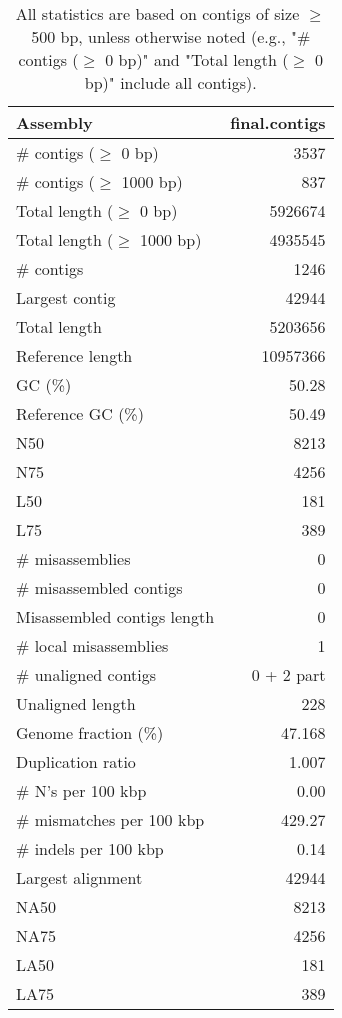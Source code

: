 \documentclass[12pt,a4paper]{article}
\begin{document}
\begin{table}[ht]
\begin{center}
\caption{All statistics are based on contigs of size $\geq$ 500 bp, unless otherwise noted (e.g., "\# contigs ($\geq$ 0 bp)" and "Total length ($\geq$ 0 bp)" include all contigs).}
\begin{tabular}{|l*{1}{|r}|}
\hline
Assembly & final.contigs \\ \hline
\# contigs ($\geq$ 0 bp) & 3537 \\ \hline
\# contigs ($\geq$ 1000 bp) & 837 \\ \hline
Total length ($\geq$ 0 bp) & 5926674 \\ \hline
Total length ($\geq$ 1000 bp) & 4935545 \\ \hline
\# contigs & 1246 \\ \hline
Largest contig & 42944 \\ \hline
Total length & 5203656 \\ \hline
Reference length & 10957366 \\ \hline
GC (\%) & 50.28 \\ \hline
Reference GC (\%) & 50.49 \\ \hline
N50 & 8213 \\ \hline
N75 & 4256 \\ \hline
L50 & 181 \\ \hline
L75 & 389 \\ \hline
\# misassemblies & 0 \\ \hline
\# misassembled contigs & 0 \\ \hline
Misassembled contigs length & 0 \\ \hline
\# local misassemblies & 1 \\ \hline
\# unaligned contigs & 0 + 2 part \\ \hline
Unaligned length & 228 \\ \hline
Genome fraction (\%) & 47.168 \\ \hline
Duplication ratio & 1.007 \\ \hline
\# N's per 100 kbp & 0.00 \\ \hline
\# mismatches per 100 kbp & 429.27 \\ \hline
\# indels per 100 kbp & 0.14 \\ \hline
Largest alignment & 42944 \\ \hline
NA50 & 8213 \\ \hline
NA75 & 4256 \\ \hline
LA50 & 181 \\ \hline
LA75 & 389 \\ \hline
\end{tabular}
\end{center}
\end{table}
\end{document}
